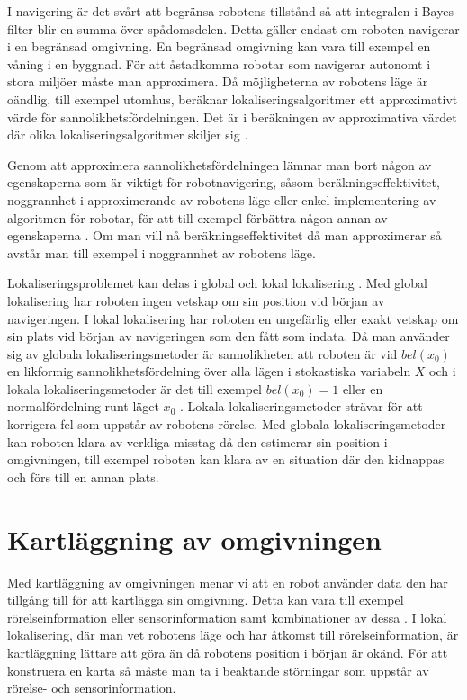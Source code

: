 I navigering är det svårt att begränsa robotens tillstånd så att integralen i Bayes filter blir en summa över spådomsdelen. Detta gäller endast om roboten navigerar i en begränsad omgivning. En begränsad omgivning kan vara till exempel en våning i en byggnad. För att åstadkomma robotar som navigerar autonomt i stora miljöer måste man approximera. Då möjligheterna av robotens läge är oändlig, till exempel utomhus, beräknar lokaliseringsalgoritmer ett approximativt värde för sannolikhetsfördelningen. Det är i beräkningen av approximativa värdet där olika lokaliseringsalgoritmer skiljer sig \citep{ProbabilisticRobotics}.

Genom att approximera sannolikhetsfördelningen lämnar man bort någon av egenskaperna som är viktigt för robotnavigering, såsom beräkningseffektivitet, noggrannhet i approximerande av robotens läge eller enkel implementering av algoritmen för robotar, för att till exempel förbättra någon annan av egenskaperna \citep{ProbabilisticRobotics}. Om man vill nå beräkningseffektivitet då man approximerar så avstår man till exempel i noggrannhet av robotens läge.

Lokaliseringsproblemet kan delas i global och lokal lokalisering \citep{982903, globalsubmaps}. Med global lokalisering har roboten ingen vetskap om sin position vid början av navigeringen. I lokal lokalisering har roboten en ungefärlig eller exakt vetskap om sin plats vid början av navigeringen som den fått som indata. Då man använder sig av globala lokaliseringsmetoder är sannolikheten att roboten är vid $bel(x_0)$ en likformig sannolikhetsfördelning över alla lägen i stokastiska variabeln $X$ och i lokala lokaliseringsmetoder är det till exempel $bel(x_0) = 1$ eller en normalfördelning runt läget $x_0$ \citep{ProbabilisticRobotics}. Lokala lokaliseringsmetoder strävar för att korrigera fel som uppstår av robotens rörelse. Med globala lokaliseringsmetoder kan roboten klara av verkliga misstag då den estimerar sin position i omgivningen, till exempel roboten kan klara av en situation där den kidnappas och förs till en annan plats.

\section{Kartläggning av omgivningen} \label{kartlaggning}

Med kartläggning av omgivningen menar vi att en robot använder data den har tillgång till för att kartlägga sin omgivning. Detta kan vara till exempel rörelseinformation eller sensorinformation samt kombinationer av dessa \citep{ProbabilisticRobotics}. I lokal lokalisering, där man vet robotens läge och har åtkomst till rörelseinformation, är kartläggning lättare att göra än då robotens position i början är okänd. För att konstruera en karta så måste man ta i beaktande störningar som uppstår av rörelse- och sensorinformation.

